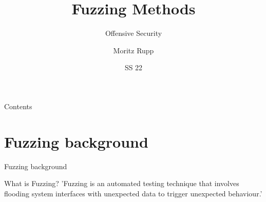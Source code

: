 \documentclass{beamer}
\title[Offensive Security]{Fuzzing Methods}
\subtitle{Offensive Security}
\author{Moritz Rupp}
\institute[MR]{Hochschule Albstadt-Sigmaringen}
\date{SS 22}
\begin{document}
\begin{frame}
 \titlepage
\end{frame}
\begin{frame}{Contents}
 \tableofcontents
\end{frame}
\section{Fuzzing background}
\begin{frame}{Fuzzing background}
\begin{block}{What is Fuzzing?}
  'Fuzzing is an automated testing technique that involves flooding system interfaces with unexpected data to trigger unexpected behaviour.'
\end{block}

\end{frame}
\end{document}

